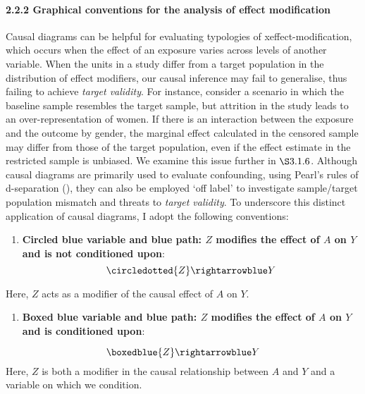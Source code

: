 \documentclass[
  singlecolumn]{article}
\let\oldparagraph\paragraph
\renewcommand{\paragraph}[1]{\oldparagraph{#1}\mbox{}}
\providecommand{\tightlist}{%
  \setlength{\itemsep}{0pt}\setlength{\parskip}{0pt}}\usepackage{longtable,booktabs,array}
\begin{document}
\paragraph{2.2.2 Graphical conventions for the analysis of effect
modification}\label{graphical-conventions-for-the-analysis-of-effect-modification}

Causal diagrams can be helpful for evaluating typologies of
xeffect-modification, which occurs when the effect of an exposure varies
across levels of another variable. When the units in a study differ from
a target population in the distribution of effect modifiers, our causal
inference may fail to generalise, thus failing to achieve \emph{target
validity}. For instance, consider a scenario in which the baseline
sample resembles the target sample, but attrition in the study leads to
an over-representation of women. If there is an interaction between the
exposure and the outcome by gender, the marginal effect calculated in
the censored sample may differ from those of the target population, even
if the effect estimate in the restricted sample is unbiased. We examine
this issue further in \(\S 3.1.6\). Although causal diagrams are
primarily used to evaluate confounding, using Pearl's rules of
d-separation (), they can also be
employed `off label' to investigate sample/target population mismatch
and threats to \emph{target validity}. To underscore this distinct
application of causal diagrams, I adopt the following conventions:

\begin{enumerate}
\def\labelenumi{\arabic{enumi}.}
\tightlist
\item
  \textbf{Circled blue variable and blue path: \(Z\) modifies the effect
  of \(A\) on \(Y\) and is not conditioned upon}: \[
  \circledotted{Z} \rightarrowblue Y 
  \]
\end{enumerate}

Here, \(Z\) acts as a modifier of the causal effect of \(A\) on \(Y\).

\begin{enumerate}
\def\labelenumi{\arabic{enumi}.}
\setcounter{enumi}{1}
\tightlist
\item
  \textbf{Boxed blue variable and blue path: \(Z\) modifies the effect
  of \(A\) on \(Y\) and is conditioned upon}:
\end{enumerate}

\[
\boxedblue{Z} \rightarrowblue Y 
\] Here, \(Z\) is both a modifier in the causal relationship between
\(A\) and \(Y\) and a variable on which we condition.
\end{document}
